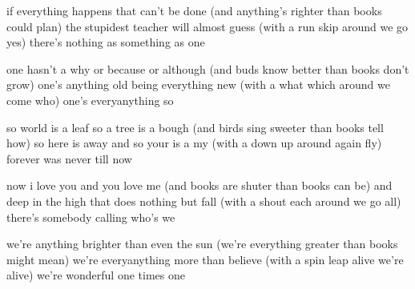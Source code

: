 \documentclass[fontsize=9, a5paper]{scrbook}
\begin{document}
\pagebreak


\pagebreak


\pagebreak


\pagebreak

\begin{poem}
	\begin{stanza}
		if everything happens that can't be done\verseline
		(and anything's righter\verseline
		than books\verseline
		could plan)\verseline
		the stupidest teacher will almost guess\verseline
		(with a run\verseline
		skip\verseline
		around we go yes)\verseline
		there's nothing as something as one
	\end{stanza}
	\begin{stanza}
		one hasn't a why or because or although\verseline
		(and buds know better\verseline
		than books\verseline
		don't grow)\verseline
		one's anything old being everything new\verseline
		(with a what\verseline
		which\verseline
		around we come who)\verseline
		one's everyanything so
	\end{stanza}
	\begin{stanza}
		so world is a leaf so a tree is a bough\verseline
		(and birds sing sweeter\verseline
		than books\verseline
		tell how)\verseline
		so here is away and so your is a my\verseline
		(with a down\verseline
		up\verseline
		around again fly)\verseline
		forever was never till now
	\end{stanza}
	\pagebreak
	\begin{stanza}
		now i love you and you love me\verseline
		(and books are shuter\verseline
		than books\verseline
		can be)\verseline
		and deep in the high that does nothing but fall\verseline
		(with a shout\verseline
		each\verseline
		around we go all)\verseline
		there's somebody calling who's we
	\end{stanza}
	\begin{stanza}
		we're anything brighter than even the sun\verseline
		(we're everything greater\verseline
		than books\verseline
		might mean)\verseline
		we're everyanything more than believe\verseline
		(with a spin\verseline
		leap\verseline
		alive we're alive)\verseline
		we're wonderful one times one
	\end{stanza}
\end{poem}
\end{document}
